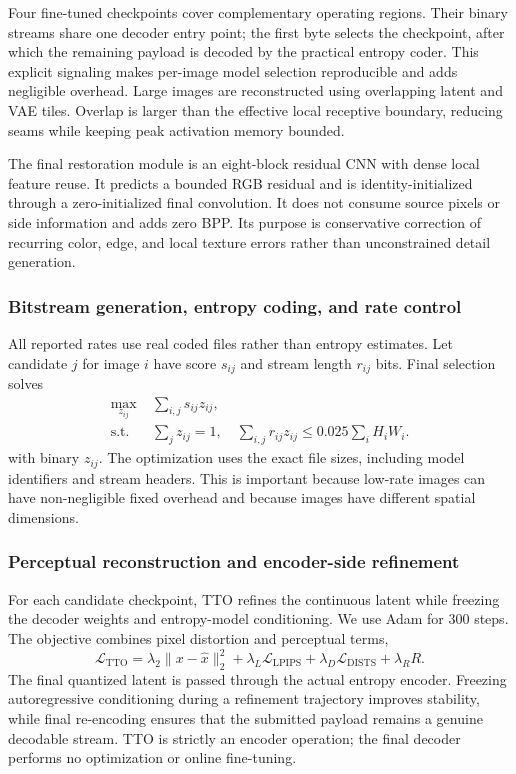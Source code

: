 \documentclass[10pt,twocolumn,letterpaper]{article}
\begin{document}
Four fine-tuned checkpoints cover complementary operating regions. Their binary streams share one decoder entry point; the first byte selects the checkpoint, after which the remaining payload is decoded by the practical entropy coder. This explicit signaling makes per-image model selection reproducible and adds negligible overhead. Large images are reconstructed using overlapping latent and VAE tiles. Overlap is larger than the effective local receptive boundary, reducing seams while keeping peak activation memory bounded.

The final restoration module is an eight-block residual CNN with dense local feature reuse. It predicts a bounded RGB residual and is identity-initialized through a zero-initialized final convolution. It does not consume source pixels or side information and adds zero BPP. Its purpose is conservative correction of recurring color, edge, and local texture errors rather than unconstrained detail generation.

\subsubsection{Bitstream generation, entropy coding, and rate control}
All reported rates use real coded files rather than entropy estimates. Let candidate $j$ for image $i$ have score $s_{ij}$ and stream length $r_{ij}$ bits. Final selection solves
\begin{align}
 \max_{z_{ij}}\;&\sum_{i,j}s_{ij}z_{ij},\\
 \text{s.t. }&\sum_jz_{ij}=1,\quad
 \sum_{i,j}r_{ij}z_{ij}\leq0.025\sum_iH_iW_i.
\end{align}
with binary $z_{ij}$. The optimization uses the exact file sizes, including model identifiers and stream headers. This is important because low-rate images can have non-negligible fixed overhead and because images have different spatial dimensions.

\subsubsection{Perceptual reconstruction and encoder-side refinement}
For each candidate checkpoint, TTO refines the continuous latent while freezing the decoder weights and entropy-model conditioning. We use Adam for 300 steps. The objective combines pixel distortion and perceptual terms,
\begin{equation}
 \mathcal{L}_{\mathrm{TTO}}=\lambda_2\|x-\hat{x}\|_2^2+\lambda_L\mathcal{L}_{\mathrm{LPIPS}}+\lambda_D\mathcal{L}_{\mathrm{DISTS}}+\lambda_R R.
\end{equation}
The final quantized latent is passed through the actual entropy encoder. Freezing autoregressive conditioning during a refinement trajectory improves stability, while final re-encoding ensures that the submitted payload remains a genuine decodable stream. TTO is strictly an encoder operation; the final decoder performs no optimization or online fine-tuning.
\end{document}

